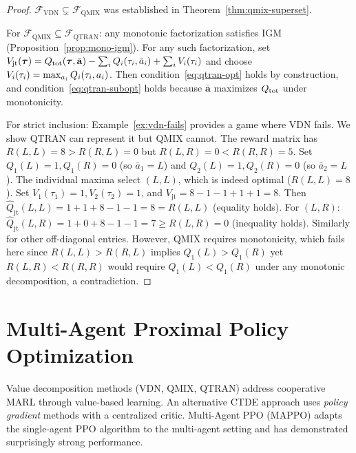 \documentclass[11pt,a4paper]{article}
\begin{document}
\begin{proof}
$\mathcal{F}_{\mathrm{VDN}} \subsetneq \mathcal{F}_{\mathrm{QMIX}}$
was established in Theorem~\ref{thm:qmix-superset}.

For $\mathcal{F}_{\mathrm{QMIX}} \subseteq \mathcal{F}_{\mathrm{QTRAN}}$:
any monotonic factorization satisfies IGM (Proposition~\ref{prop:mono-igm}).
For any such factorization, set $V_{\mathrm{jt}}(\boldsymbol{\tau}) =
Q_{\mathrm{tot}}(\boldsymbol{\tau}, \bar{\mathbf{a}}) - \sum_i Q_i(\tau_i,
\bar{a}_i) + \sum_i V_i(\tau_i)$ and choose $V_i(\tau_i) =
\max_{a_i} Q_i(\tau_i, a_i)$.  Then
condition~\eqref{eq:qtran-opt} holds by construction, and
condition~\eqref{eq:qtran-subopt} holds because $\bar{\mathbf{a}}$
maximizes $Q_{\mathrm{tot}}$ under monotonicity.

For strict inclusion: Example~\ref{ex:vdn-fails} provides a
game where VDN fails.  We show QTRAN can represent it but QMIX
cannot.  The reward matrix has $R(L,L) = 8 > R(R,L) = 0$ but
$R(L,R) = 0 < R(R,R) = 5$.  Set $Q_1(L) = 1, Q_1(R) = 0$
(so $\bar{a}_1 = L$) and $Q_2(L) = 1, Q_2(R) = 0$ (so $\bar{a}_2
= L$).  The individual maxima select $(L, L)$, which is indeed
optimal ($R(L,L) = 8$).  Set $V_1(\tau_1) = 1, V_2(\tau_2) = 1$,
and $V_{\mathrm{jt}} = 8 - 1 - 1 + 1 + 1 = 8$.  Then
$\hat{Q}_{\mathrm{jt}}(L,L) = 1 + 1 + 8 - 1 - 1 = 8 = R(L,L)$
(equality holds).  For $(L, R)$: $\hat{Q}_{\mathrm{jt}}(L,R) = 1
+ 0 + 8 - 1 - 1 = 7 \geq R(L,R) = 0$ (inequality holds).
Similarly for other off-diagonal entries.  However, QMIX requires
monotonicity, which fails here since $R(L,L) > R(R,L)$ implies
$Q_1(L) > Q_1(R)$ yet $R(L,R) < R(R,R)$ would require
$Q_1(L) < Q_1(R)$ under any monotonic decomposition, a
contradiction.
\end{proof}

\section{Multi-Agent Proximal Policy Optimization}
\label{sec:mappo}

Value decomposition methods (VDN, QMIX, QTRAN) address cooperative
MARL through value-based learning.  An alternative CTDE approach
uses \emph{policy gradient} methods with a centralized critic.
Multi-Agent PPO (MAPPO) \citep{yu2022} adapts the single-agent
PPO algorithm to the multi-agent setting and has demonstrated
surprisingly strong performance.
\end{document}
